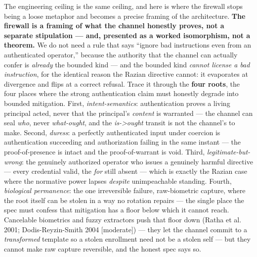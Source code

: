 \documentclass[11pt]{article}
\begin{document}
The engineering ceiling is the same ceiling, and here is where the firewall stops being a loose metaphor and becomes a precise framing of the architecture. \textbf{The firewall is a framing of what the channel honestly proves, not a separate stipulation — and, presented as a worked isomorphism, not a theorem.} We do not need a rule that says ``ignore bad instructions even from an authenticated operator,'' because the authority that the channel can actually confer is \emph{already} the bounded kind — and the bounded kind \emph{cannot license a bad instruction}, for the identical reason the Razian directive cannot: it evaporates at divergence and flips at a correct refusal. Trace it through the \textbf{four roots}, the four places where the strong authentication claim must honestly degrade into bounded mitigation. First, \emph{intent-semantics}: authentication proves a living principal acted, never that the principal's \emph{content} is warranted — the channel can seal \emph{who}, never \emph{what-ought}, and the \emph{is->ought} transit is not the channel's to make. Second, \emph{duress}: a perfectly authenticated input under coercion is authentication succeeding and authorization failing in the same instant — the proof-of-presence is intact and the proof-of-warrant is void. Third, \emph{legitimate-but-wrong}: the genuinely authorized operator who issues a genuinely harmful directive — every credential valid, the \emph{for} still absent — which is exactly the Razian case where the normative power lapses \emph{despite} unimpeachable standing. Fourth, \emph{biological permanence}: the one irreversible failure, raw-biometric capture, where the root itself can be stolen in a way no rotation repairs — the single place the spec must confess that mitigation has a floor below which it cannot reach. Cancelable biometrics and fuzzy extractors push that floor down (Ratha et al. 2001; Dodis-Reyzin-Smith 2004 [moderate]) — they let the channel commit to a \emph{transformed} template so a stolen enrollment need not be a stolen self — but they cannot make raw capture reversible, and the honest spec says so.
\end{document}
